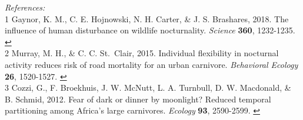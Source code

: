 \documentclass[]{article}
\begin{document}
\emph{References:}\\
1 Gaynor, K. M., C. E. Hojnowski, N. H. Carter, \& J. S. Brashares,
2018. The influence of human disturbance on wildlife nocturnality.
\emph{Science} \textbf{360}, 1232-1235. \protect\hyperlink{a1}{↩︎}\\
2 Murray, M. H., \& C. C. St.~Clair, 2015. Individual flexibility in
nocturnal activity reduces risk of road mortality for an urban
carnivore. \emph{Behavioral Ecology} \textbf{26}, 1520-1527.
\protect\hyperlink{a2}{↩︎}\\
3 Cozzi, G., F. Broekhuis, J. W. McNutt, L. A. Turnbull, D. W.
Macdonald, \& B. Schmid, 2012. Fear of dark or dinner by moonlight?
Reduced temporal partitioning among Africa's large carnivores.
\emph{Ecology} \textbf{93}, 2590-2599. \protect\hyperlink{a3}{↩︎}
\end{document}
